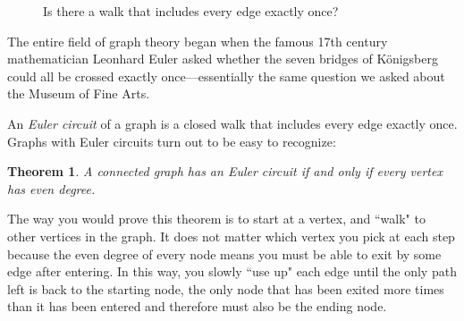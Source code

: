 \documentclass[11pt,oneside]{book}
\newtheorem{thm}{Theorem}[section]
\theoremstyle{definition}
\begin{document}
\begin{figure}[H]
  \centering
  \caption{Is there a walk that includes every edge exactly once?}
  \label{fig:museumGraph}
\end{figure}

The entire field of graph theory began when the famous 17th century mathematician Leonhard Euler asked whether the seven bridges of K\"onigsberg could all be crossed exactly once---essentially the same question we asked about the Museum of Fine Arts.

An \emph{Euler circuit} of a graph is a closed walk that includes every edge exactly once.
Graphs with Euler circuits turn out to be easy to recognize:

\begin{thm} \label{thm:EulerCircuit}
  A connected graph has an Euler circuit if and only if every vertex has even degree.
\end{thm}

The way you would prove this theorem is to start at a vertex, and ``walk" to other vertices in the graph.
It does not matter which vertex you pick at each step because the even degree of every node means you must be able to exit by some edge after entering.
In this way, you slowly ``use up" each edge until the only path left is back to the starting node, the only node that has been exited more times than it has been entered and therefore must also be the ending node.
\end{document}
